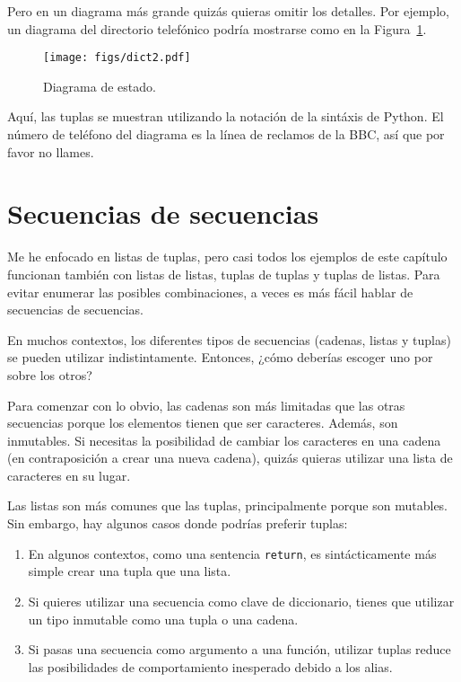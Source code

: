 \documentclass[10pt]{book}
\begin{document}
Pero en un diagrama más grande quizás quieras omitir los
detalles.  Por ejemplo, un diagrama del directorio telefónico podría
mostrarse como en la Figura~\ref{fig.dict2}.

\begin{figure}
\centerline
{\texttt{[image: figs/dict2.pdf]}}
\caption{Diagrama de estado.}
\label{fig.dict2}
\end{figure}

Aquí, las tuplas se muestran utilizando la notación de la sintáxis de Python.
El número de teléfono del diagrama es la línea de reclamos
de la BBC, así que por favor no llames.


\section{Secuencias de secuencias}

Me he enfocado en listas de tuplas, pero casi todos los ejemplos de
este capítulo funcionan también con listas de listas, tuplas de tuplas y
tuplas de listas.  Para evitar enumerar las posibles combinaciones, a veces
es más fácil hablar de secuencias de secuencias.

En muchos contextos, los diferentes tipos de secuencias (cadenas, listas y
tuplas) se pueden utilizar indistintamente.  Entonces, ¿cómo deberías escoger uno
por sobre los otros?

Para comenzar con lo obvio, las cadenas son más limitadas que las otras
secuencias porque los elementos tienen que ser caracteres.  Además,
son inmutables.  Si necesitas la posibilidad de cambiar los caracteres
en una cadena (en contraposición a crear una nueva cadena), quizás quieras
utilizar una lista de caracteres en su lugar.

Las listas son más comunes que las tuplas, principalmente porque son mutables.
Sin embargo, hay algunos casos donde podrías preferir tuplas:

\begin{enumerate}

\item En algunos contextos, como una sentencia {\tt return}, es
sintácticamente más simple crear una tupla que una lista.

\item Si quieres utilizar una secuencia como clave de diccionario,
tienes que utilizar un tipo inmutable como una tupla o una cadena.

\item Si pasas una secuencia como argumento a una función,
utilizar tuplas reduce las posibilidades de comportamiento inesperado
debido a los alias.

\end{enumerate}
\end{document}
